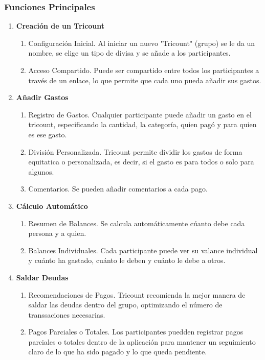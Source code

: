 \subsubsection{Funciones Principales}
\label{subsubsec:funciones}
\begin{enumerate}
    \item \textbf{Creación de un Tricount}
    \begin{enumerate}
        \item Configuración Inicial. Al iniciar un nuevo "Tricount" (grupo) se le da un nombre, se elige un tipo de divisa y se añade a los participantes.
        \item Acceso Compartido. Puede ser compartido entre todos los participantes a través de un enlace, lo que permite que cada uno pueda añadir sus gastos.
    \end{enumerate}
    \item \textbf{Añadir Gastos}
    \begin{enumerate}
        \item Registro de Gastos. Cualquier participante puede añadir un gasto en el tricount, especificando la cantidad, la categoría,
        quien pagó y para quien es ese gasto.
        \item División Personalizada. Tricount permite dividir los gastos de forma equitatica o personalizada, es decir, si el gasto es para todos o solo para algunos. 
        \item Comentarios. Se pueden añadir comentarios a cada pago.
    \end{enumerate}
    \item \textbf{Cálculo Automático}
    \begin{enumerate}
        \item Resumen de Balances. Se calcula automáticamente cúanto debe cada persona y a quien. 
        \item Balances Individuales. Cada participante puede ver su valance individual y cuánto ha gastado, cuánto le deben y cuánto le debe a otros.
    \end{enumerate}
    \item \textbf{Saldar Deudas}
    \begin{enumerate}
        \item Recomendaciones de Pagos. Tricount recomienda la mejor manera de saldar las deudas dentro del grupo, optimizando el número de 
        transsaciones necesarias.
        \item Pagos Parciales o Totales. Los participantes puedden registrar pagos parciales o totales dentro de la aplicación para mantener un
        seguimiento claro de lo que ha sido pagado y lo que queda pendiente.
    \end{enumerate}
\end{enumerate}

